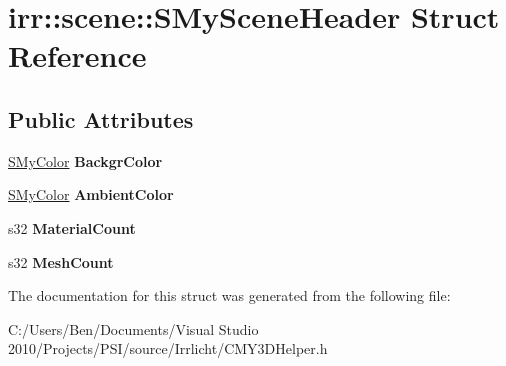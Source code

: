 \hypertarget{structirr_1_1scene_1_1_s_my_scene_header}{\section{irr\-:\-:scene\-:\-:S\-My\-Scene\-Header Struct Reference}
\label{structirr_1_1scene_1_1_s_my_scene_header}
}
\subsection*{Public Attributes}
\begin{DoxyCompactItemize}
\item 
\hypertarget{structirr_1_1scene_1_1_s_my_scene_header_a3e10dab52928ca2429912d8e5ab94b9d}{\hyperlink{structirr_1_1scene_1_1_s_my_color}{S\-My\-Color} {\bfseries Backgr\-Color}}\label{structirr_1_1scene_1_1_s_my_scene_header_a3e10dab52928ca2429912d8e5ab94b9d}

\item 
\hypertarget{structirr_1_1scene_1_1_s_my_scene_header_a3de203a883a1efcd5889e790c0a6faa3}{\hyperlink{structirr_1_1scene_1_1_s_my_color}{S\-My\-Color} {\bfseries Ambient\-Color}}\label{structirr_1_1scene_1_1_s_my_scene_header_a3de203a883a1efcd5889e790c0a6faa3}

\item 
\hypertarget{structirr_1_1scene_1_1_s_my_scene_header_a5e6f00ab36cc5aabf6cb4d78d9f0de56}{s32 {\bfseries Material\-Count}}\label{structirr_1_1scene_1_1_s_my_scene_header_a5e6f00ab36cc5aabf6cb4d78d9f0de56}

\item 
\hypertarget{structirr_1_1scene_1_1_s_my_scene_header_a847b7b95189ceb801177c7968a6abbc6}{s32 {\bfseries Mesh\-Count}}\label{structirr_1_1scene_1_1_s_my_scene_header_a847b7b95189ceb801177c7968a6abbc6}

\end{DoxyCompactItemize}


The documentation for this struct was generated from the following file\-:\begin{DoxyCompactItemize}
\item 
C\-:/\-Users/\-Ben/\-Documents/\-Visual Studio 2010/\-Projects/\-P\-S\-I/source/\-Irrlicht/C\-M\-Y3\-D\-Helper.\-h\end{DoxyCompactItemize}
